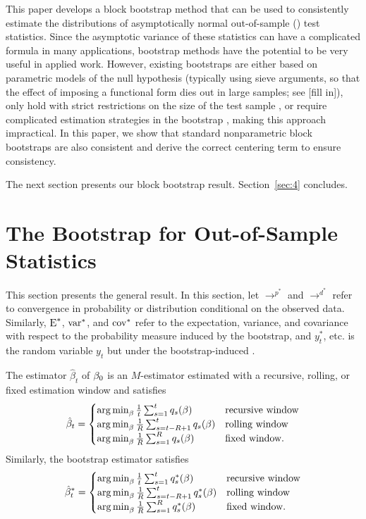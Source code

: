 \documentclass[12pt,fleqn]{article}
\begin{document}
This paper develops a block bootstrap method that can be used to
consistently estimate the distributions of asymptotically normal
out-of-sample (\oos) test statistics. Since the asymptotic variance of
these statistics can have a complicated formula in many applications,
bootstrap methods have the potential to be very useful in applied
work. However, existing bootstraps are either based on parametric
models of the null hypothesis (typically using sieve arguments, so
that the effect of imposing a functional form dies out in large
samples; see [fill in]), only hold with strict restrictions on the
size of the test sample \citep{Whi:00,Han:05}, or require complicated
estimation strategies in the bootstrap \citep{CoS:07}, making this
approach impractical. In this paper, we show that standard
nonparametric block bootstraps are also consistent and derive the
correct centering term to ensure consistency.

The next section presents our block bootstrap result.
Section~\ref{sec:4} concludes.

\section{The Bootstrap for Out-of-Sample Statistics}\label{sec:1b}
This section
presents the general result.  In this section, let $\to^{p^{*}}$ and
$\to^{d^{*}}$ refer to convergence in probability or distribution
conditional on the observed data.  Similarly, $\operatorname{E}^{*}$, $\operatorname{var}^{*}$,
and $\operatorname{cov}^{*}$ refer to the expectation, variance, and covariance with
respect to the probability measure induced by the bootstrap, and
$y_t^{*}$, etc. is the random variable $y_t$ but under the
bootstrap-induced \cdf.

\begin{asmp}\label{a1}
  The estimator $\hat{\beta}_t$ of $\btrue$ is an $M$-estimator estimated with a
  recursive, rolling, or fixed estimation window and satisfies
  \begin{equation*}
    \hat\beta_t = \begin{cases}
      \operatorname*{arg\,min}_\beta \tfrac1t \sum_{s=1}^t q_{s}(\beta) & \text{recursive window} \\
      \operatorname*{arg\,min}_\beta \tfrac1R \sum_{s=t-R+1}^t q_{s}(\beta) & \text{rolling window} \\
      \operatorname*{arg\,min}_\beta \tfrac1R \sum_{s=1}^R q_{s}(\beta) & \text{fixed window}.
    \end{cases}
  \end{equation*}
  Similarly, the bootstrap estimator satisfies
  \begin{equation*}
    \hat\beta_t^* = \begin{cases}
      \operatorname*{arg\,min}_\beta \tfrac1t \sum_{s=1}^t q_{s}^*(\beta) & \text{recursive window} \\
      \operatorname*{arg\,min}_\beta \tfrac1R \sum_{s=t-R+1}^t q_{s}^*(\beta) & \text{rolling window} \\
      \operatorname*{arg\,min}_\beta \tfrac1R \sum_{s=1}^R q_{s}^*(\beta) & \text{fixed window}.
    \end{cases}
  \end{equation*}
\end{asmp}
\end{document}
